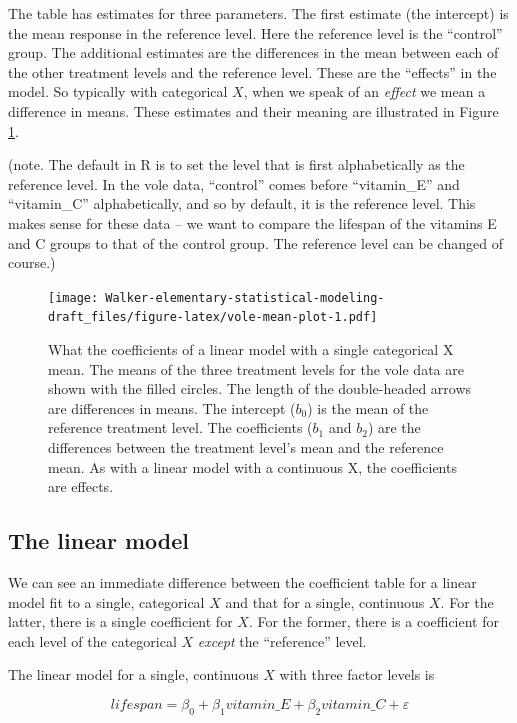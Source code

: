 \documentclass[]{book}
\theoremstyle{definition}
\theoremstyle{definition}
\theoremstyle{definition}
\theoremstyle{remark}
\begin{document}
The table has estimates for three parameters. The first estimate (the
intercept) is the mean response in the reference level. Here the
reference level is the ``control'' group. The additional estimates are
the differences in the mean between each of the other treatment levels
and the reference level. These are the ``effects'' in the model. So
typically with categorical \(X\), when we speak of an \emph{effect} we
mean a difference in means. These estimates and their meaning are
illustrated in Figure \ref{fig:vole-mean-plot}.

(note. The default in R is to set the level that is first alphabetically
as the reference level. In the vole data, ``control'' comes before
``vitamin\_E'' and ``vitamin\_C'' alphabetically, and so by default, it
is the reference level. This makes sense for these data -- we want to
compare the lifespan of the vitamins E and C groups to that of the
control group. The reference level can be changed of course.)

\begin{figure}
\centering
\texttt{[image: Walker-elementary-statistical-modeling-draft\_files/figure-latex/vole-mean-plot-1.pdf]}
\caption{\label{fig:vole-mean-plot}What the coefficients of a linear model
with a single categorical X mean. The means of the three treatment
levels for the vole data are shown with the filled circles. The length
of the double-headed arrows are differences in means. The intercept
(\(b_0\)) is the mean of the reference treatment level. The coefficients
(\(b_1\) and \(b_2\)) are the differences between the treatment level's
mean and the reference mean. As with a linear model with a continuous X,
the coefficients are effects.}
\end{figure}

\subsection{The linear model}\label{the-linear-model}

We can see an immediate difference between the coefficient table for a
linear model fit to a single, categorical \(X\) and that for a single,
continuous \(X\). For the latter, there is a single coefficient for
\(X\). For the former, there is a coefficient for each level of the
categorical \(X\) \emph{except} the ``reference'' level.

The linear model for a single, continuous \(X\) with three factor levels
is

\begin{equation}
lifespan = \beta_0 + \beta_1 vitamin\_E + \beta_2 vitamin\_C + \varepsilon
\end{equation}
\end{document}
